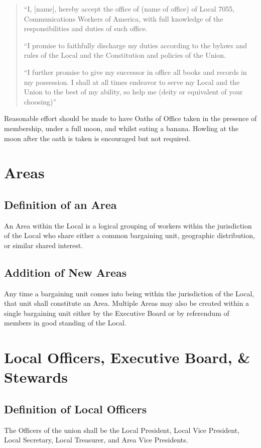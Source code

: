 \documentclass[12pt]{article}
\begin{document}
\begin{quote}
``I, [name], hereby accept the office of (name of office) of Local 7055, Communications Workers of America, with full knowledge of the responsibilities and duties of such office.

``I promise to faithfully discharge my duties according to the bylaws and rules of the Local and the Constitution and policies of the Union.

``I further promise to give my successor in office all books and records in my possession. I shall at all times endeavor to serve my Local and the Union to the best of my ability, so help me (deity or equivalent of your choosing)''
\end{quote}

Reasonable effort should be made to have Oaths of Office taken in the presence of membership, under a full moon, and whilst eating a banana. Howling at the moon after the oath is taken is encouraged but not required.

\section{Areas}
\subsection{Definition of an Area}
An Area within the Local is a logical grouping of workers within the jurisdiction of the Local who share either a common bargaining unit, geographic distribution, or similar shared interest.

\subsection{Addition of New Areas}
Any time a bargaining unit comes into being within the jurisdiction of the Local, that unit shall constitute an Area. Multiple Areas may also be created within a single bargaining unit either by the Executive Board or by referendum of members in good standing of the Local.

\section{Local Officers, Executive Board, \& Stewards}
\subsection{Definition of Local Officers}
The Officers of the union shall be the Local President, Local Vice President, Local Secretary, Local Treasurer, and Area Vice Presidents.
\end{document}
